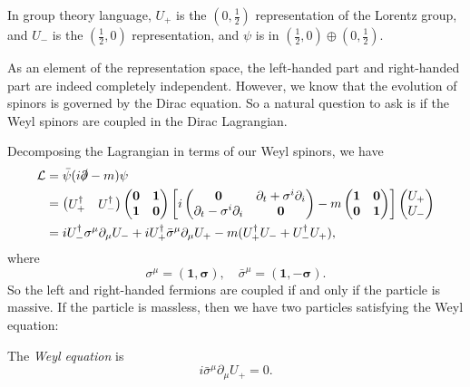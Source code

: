 \documentclass[a4paper]{article}
\begin{document}
In group theory language, $U_+$ is the $(0, \frac{1}{2})$ representation of the Lorentz group, and $U_-$ is the $(\frac{1}{2}, 0)$ representation, and $\psi$ is in $(\frac{1}{2}, 0) \oplus (0, \frac{1}{2})$.

As an element of the representation space, the left-handed part and right-handed part are indeed completely independent. However, we know that the evolution of spinors is governed by the Dirac equation. So a natural question to ask is if the Weyl spinors are coupled in the Dirac Lagrangian.

Decomposing the Lagrangian in terms of our Weyl spinors, we have
\begin{align*}
  \mathcal{L} &= \bar\psi(i\slashed\partial - m)\psi\\
  &=
  \begin{pmatrix}
    U_+^\dagger & U_-^\dagger
  \end{pmatrix}
  \begin{pmatrix}
    \mathbf{0} & \mathbf{1}\\
    \mathbf{1} & \mathbf{0}
  \end{pmatrix}
  \left[
    i
    \begin{pmatrix}
      \mathbf{0} & \partial_t + \sigma^i \partial_i\\
      \partial_t - \sigma^i \partial_i & \mathbf{0}
    \end{pmatrix} - m
    \begin{pmatrix}
      \mathbf{1} & \mathbf{0}\\
      \mathbf{0} & \mathbf{1}
  \end{pmatrix}\right]
  \begin{pmatrix}
    U_+\\ U_-
  \end{pmatrix}\\
  &= i U_-^\dagger \sigma^\mu \partial_\mu U_- + i U_+^\dagger \bar\sigma^\mu \partial_\mu U_+ - m(U_+^\dagger U_- + U_-^\dagger U_+),
\end{align*}
where
\[
  \sigma^\mu = (\mathbf{1}, \boldsymbol\sigma),\quad \bar{\sigma}^\mu = (\mathbf{1}, -\boldsymbol\sigma).
\]
So the left and right-handed fermions are coupled if and only if the particle is massive. If the particle is massless, then we have two particles satisfying the Weyl equation:
\begin{defi}
  The \emph{Weyl equation} is
  \[
    i \bar{\sigma}^\mu \partial_\mu U_+ = 0.
  \]
\end{defi}
\end{document}
